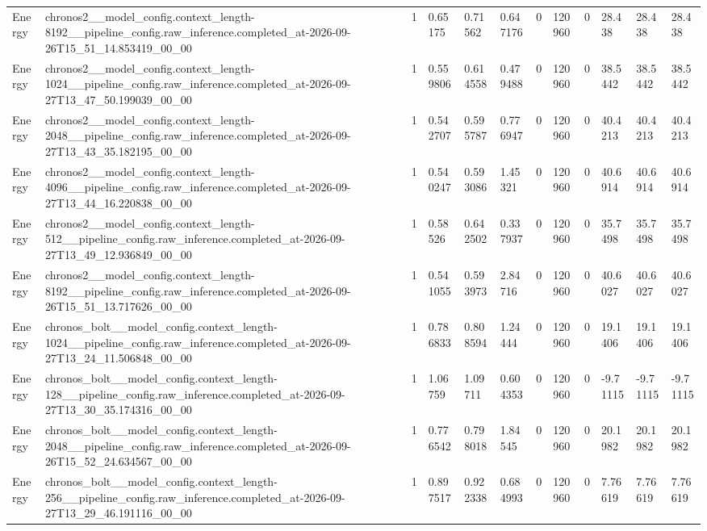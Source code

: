 \begin{tabular}{llllllllllll}
Energy & chronos2\_\_model\_config.context\_length-8192\_\_pipeline\_config.raw\_inference.completed\_at-2026-09-26T15\_51\_14.853419\_00\_00 & 1 & 0.65175 & 0.71562 & 0.647176 & 0 & 120960 & 0 & 28.438 & 28.438 & 28.438 \\
Energy & chronos2\_\_model\_config.context\_length-1024\_\_pipeline\_config.raw\_inference.completed\_at-2026-09-27T13\_47\_50.199039\_00\_00 & 1 & 0.559806 & 0.614558 & 0.479488 & 0 & 120960 & 0 & 38.5442 & 38.5442 & 38.5442 \\
Energy & chronos2\_\_model\_config.context\_length-2048\_\_pipeline\_config.raw\_inference.completed\_at-2026-09-27T13\_43\_35.182195\_00\_00 & 1 & 0.542707 & 0.595787 & 0.776947 & 0 & 120960 & 0 & 40.4213 & 40.4213 & 40.4213 \\
Energy & chronos2\_\_model\_config.context\_length-4096\_\_pipeline\_config.raw\_inference.completed\_at-2026-09-27T13\_44\_16.220838\_00\_00 & 1 & 0.540247 & 0.593086 & 1.45321 & 0 & 120960 & 0 & 40.6914 & 40.6914 & 40.6914 \\
Energy & chronos2\_\_model\_config.context\_length-512\_\_pipeline\_config.raw\_inference.completed\_at-2026-09-27T13\_49\_12.936849\_00\_00 & 1 & 0.58526 & 0.642502 & 0.337937 & 0 & 120960 & 0 & 35.7498 & 35.7498 & 35.7498 \\
Energy & chronos2\_\_model\_config.context\_length-8192\_\_pipeline\_config.raw\_inference.completed\_at-2026-09-26T15\_51\_13.717626\_00\_00 & 1 & 0.541055 & 0.593973 & 2.84716 & 0 & 120960 & 0 & 40.6027 & 40.6027 & 40.6027 \\
Energy & chronos\_bolt\_\_model\_config.context\_length-1024\_\_pipeline\_config.raw\_inference.completed\_at-2026-09-27T13\_24\_11.506848\_00\_00 & 1 & 0.786833 & 0.808594 & 1.24444 & 0 & 120960 & 0 & 19.1406 & 19.1406 & 19.1406 \\
Energy & chronos\_bolt\_\_model\_config.context\_length-128\_\_pipeline\_config.raw\_inference.completed\_at-2026-09-27T13\_30\_35.174316\_00\_00 & 1 & 1.06759 & 1.09711 & 0.604353 & 0 & 120960 & 0 & -9.71115 & -9.71115 & -9.71115 \\
Energy & chronos\_bolt\_\_model\_config.context\_length-2048\_\_pipeline\_config.raw\_inference.completed\_at-2026-09-26T15\_52\_24.634567\_00\_00 & 1 & 0.776542 & 0.798018 & 1.84545 & 0 & 120960 & 0 & 20.1982 & 20.1982 & 20.1982 \\
Energy & chronos\_bolt\_\_model\_config.context\_length-256\_\_pipeline\_config.raw\_inference.completed\_at-2026-09-27T13\_29\_46.191116\_00\_00 & 1 & 0.897517 & 0.922338 & 0.684993 & 0 & 120960 & 0 & 7.76619 & 7.76619 & 7.76619 \\

\end{tabular}
